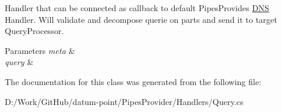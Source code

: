 Handler that can be connected as callback to default Pipes\+Provides \mbox{\hyperlink{class_pipes_provider_1_1_handlers_1_1_d_n_s}{D\+NS}} Handler. Will validate and decompose querie on parts and send it to target Query\+Processor. 


\begin{DoxyParams}{Parameters}
{\em meta} & \\
\hline
{\em query} & \\
\hline
\end{DoxyParams}


The documentation for this class was generated from the following file\+:\begin{DoxyCompactItemize}
\item 
D\+:/\+Work/\+Git\+Hub/datum-\/point/\+Pipes\+Provider/\+Handlers/Query.\+cs\end{DoxyCompactItemize}
